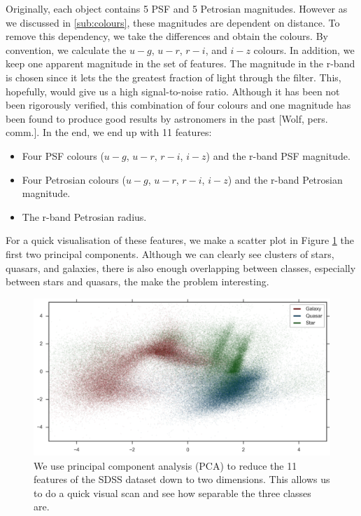 Originally, each object contains 5 PSF and 5 Petrosian magnitudes.
However as we discussed
in \ref{sub:colours}, these magnitudes are dependent on distance. To remove this
dependency,  we take 
the differences and obtain the colours. By convention, we calculate the $u-g$, $u-r$, $r-i$,
and $i-z$ colours. In addition, we keep one apparent magnitude in the set of features.
The magnitude in the r-band is chosen since it lets the the greatest fraction of light through
the filter. This, hopefully, would give us a high signal-to-noise ratio.
Although it has been not been rigorously verified, this combination of four colours and
one magnitude has been found to produce good results by astronomers in the past [Wolf, pers. comm.].
In the end, we end up with 11 features:
\begin{itemize}
	\item Four PSF colours ($u-g$, $u-r$, $r-i$, $i-z$) and the r-band PSF magnitude.
	\item Four Petrosian colours ($u-g$, $u-r$, $r-i$, $i-z$) and the r-band Petrosian magnitude.
	\item The r-band Petrosian radius.
\end{itemize}
For a quick visualisation of these features, we make a scatter
plot in Figure \ref{fig:sdss_pca_all}
the first two principal components. Although we can clearly see clusters of stars, quasars, 
and galaxies, there is also enough  overlapping between classes, especially between
stars and quasars, the make the problem interesting.

\begin{figure}[tbp]
	\centering
	\includegraphics[width=\textwidth]{figures/4_expt1/sdss_pca_all}
	\caption[First two principcal components of the SDSS dataset]{We use principal
		component analysis (PCA) to reduce the 11 features of the SDSS dataset down
		to two dimensions. This allows us to do a quick visual scan and see how
		separable the three classes are.}
	\label{fig:sdss_pca_all}
\end{figure}


